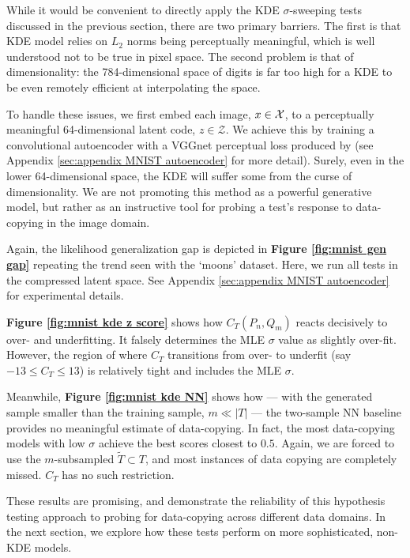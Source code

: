 While it would be convenient to directly apply the KDE $\sigma$-sweeping tests discussed in the previous section, there are two primary barriers. The first is that KDE model relies on $L_2$ norms being perceptually meaningful, which is well understood not to be true in pixel space. The second problem is that of dimensionality: the 784-dimensional space of digits is far too high for a KDE to be even remotely efficient at interpolating the space. 

To handle these issues, we first embed each image, $x \in \mathcal{X}$, to a perceptually meaningful 64-dimensional latent code, $z \in \mathcal{Z}$. We achieve this by training a convolutional autoencoder with a VGGnet perceptual loss produced by \cite{zhang} (see Appendix \ref{sec:appendix MNIST autoencoder} for more detail). Surely, even in the lower 64-dimensional space, the KDE will suffer some from the curse of dimensionality. We are not promoting this method as a powerful generative model, but rather as an instructive tool for probing a test's response to data-copying in the image domain. 

Again, the likelihood generalization gap is depicted in \textbf{Figure \ref{fig:mnist gen gap}} repeating the trend seen with the `moons' dataset. 
Here, we run all tests in the compressed latent space. See Appendix \ref{sec:appendix MNIST autoencoder} for experimental details. 

\textbf{Figure \ref{fig:mnist kde z score}} shows how $C_T(P_n, Q_m)$ reacts decisively to over- and underfitting. It falsely determines the MLE $\sigma$ value as slightly over-fit. However, the region of where $C_T$ transitions from over- to underfit (say $-13 \leq C_T \leq 13$) is relatively tight and includes the MLE $\sigma$.

Meanwhile, \textbf{Figure \ref{fig:mnist kde NN}} shows how --- with the generated sample smaller than the training sample, $m \ll |T|$ --- the two-sample NN baseline provides no meaningful estimate of data-copying. In fact, the most data-copying models with low $\sigma$ achieve the best scores closest to $0.5$. Again, we are forced to use the $m$-subsampled $\widetilde{T} \subset T$, and most instances of data copying are completely missed. $C_T$ has no such restriction.

These results are promising, and demonstrate the reliability of this hypothesis testing approach to probing for data-copying across different data domains. In the next section, we explore how these tests perform on more sophisticated, non-KDE models. 

